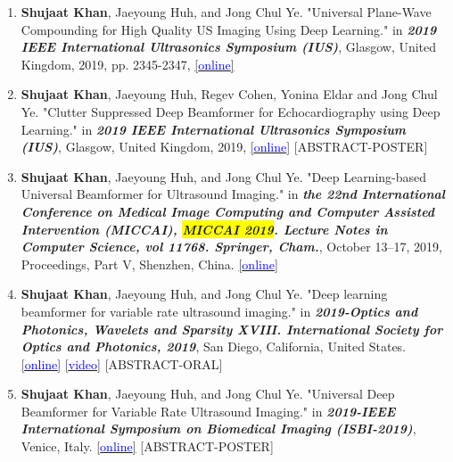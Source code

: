 \begin{enumerate}
    \item \textbf{Shujaat Khan}, Jaeyoung Huh, and Jong Chul Ye. "Universal Plane-Wave Compounding for High Quality US Imaging Using Deep Learning." in  \textit{\textbf{2019 IEEE International Ultrasonics Symposium (IUS)}}, Glasgow, United Kingdom, 2019, pp. 2345-2347, \href{https://doi.org/10.1109/ULTSYM.2019.8925679}{[\textcolor{blue}{online}]}
    
    \item \textbf{Shujaat Khan}, Jaeyoung Huh, Regev Cohen, Yonina Eldar and Jong Chul Ye. "Clutter Suppressed Deep Beamformer for Echocardiography using Deep Learning." in \textit{\textbf{2019 IEEE International Ultrasonics Symposium (IUS)}}, Glasgow, United Kingdom, 2019, \href{https://doi.org/10.13140/RG.2.2.15564.77443}{[\textcolor{blue}{online}]} [ABSTRACT-POSTER]
    
    \item \textbf{Shujaat Khan}, Jaeyoung Huh, and Jong Chul Ye. "Deep Learning-based Universal Beamformer for Ultrasound Imaging." in \textit{\textbf{the 22nd International Conference on Medical Image Computing and Computer Assisted Intervention (MICCAI), \colorbox{yellow}{MICCAI 2019}. Lecture Notes in Computer Science, vol 11768. Springer, Cham.}}, October 13–17, 2019, Proceedings, Part V, Shenzhen, China. \href{https://doi.org/10.1007/978-3-030-32254-0_69}{[\textcolor{blue}{online}]}
    
    \item \textbf{Shujaat Khan}, Jaeyoung Huh, and Jong Chul Ye. "Deep learning beamformer for variable rate ultrasound imaging." in  \textit{\textbf{2019-Optics and Photonics, Wavelets and Sparsity XVIII. International Society for Optics and Photonics, 2019}}, San Diego, California, United States. 
    \href{https://arxiv.org/abs/1901.01706}{[\textcolor{blue}{online}]} \href{https://youtu.be/1pzLPKOp9ZU}{[\textcolor{blue}{video}]} [ABSTRACT-ORAL]

    \item \textbf{Shujaat Khan}, Jaeyoung Huh, and Jong Chul Ye. "Universal Deep Beamformer for Variable Rate Ultrasound Imaging." in  \textit{\textbf{2019-IEEE International Symposium on Biomedical Imaging (ISBI-2019)}}, Venice, Italy.
    \href{https://doi.org/10.13140/RG.2.2.15413.91363}{[\textcolor{blue}{online}]} [ABSTRACT-POSTER]
    
    

\end{enumerate}
